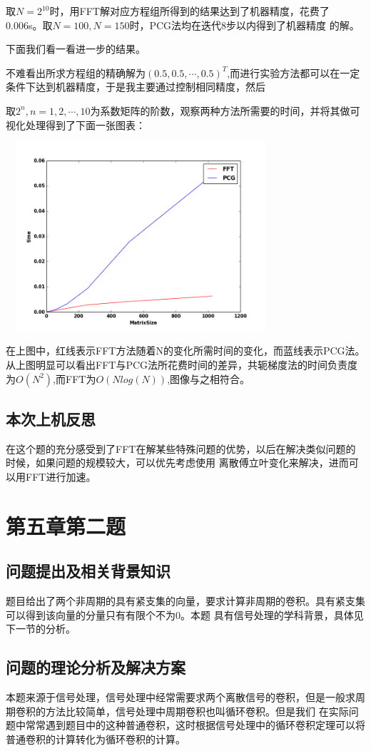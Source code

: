 \documentclass[10pt,a4paper]{ctexart}
\begin{document}
取$N=2^{10}$时，用FFT解对应方程组所得到的结果达到了机器精度，花费了0.006s。取$N=100,N=150$时，PCG法均在迭代8步以内得到了机器精度
的解。

下面我们看一看进一步的结果。

不难看出所求方程组的精确解为$(0.5,0.5,\cdots,0.5)^T$,而进行实验方法都可以在一定条件下达到机器精度，于是我主要通过控制相同精度，然后

取$2^{n},n=1,2,\cdots,10$为系数矩阵的阶数，观察两种方法所需要的时间，并将其做可视化处理得到了下面一张图表：
\par
\centerline{\includegraphics[height=7cm,width=10cm]{fft1.png}}
\par
在上图中，红线表示FFT方法随着N的变化所需时间的变化，而蓝线表示PCG法。
从上图明显可以看出FFT与PCG法所花费时间的差异，共轭梯度法的时间负责度为$O(N^2)$,而FFT为$O(Nlog(N))$,图像与之相符合。
\subsection{本次上机反思}
在这个题的充分感受到了FFT在解某些特殊问题的优势，以后在解决类似问题的时候，如果问题的规模较大，可以优先考虑使用
离散傅立叶变化来解决，进而可以用FFT进行加速。
\section{第五章第二题}
\subsection{问题提出及相关背景知识}
题目给出了两个非周期的具有紧支集的向量，要求计算非周期的卷积。具有紧支集可以得到该向量的分量只有有限个不为0。本题
具有信号处理的学科背景，具体见下一节的分析。
\subsection{问题的理论分析及解决方案}
本题来源于信号处理，信号处理中经常需要求两个离散信号的卷积，但是一般求周期卷积的方法比较简单，信号处理中周期卷积也叫循环卷积。但是我们
在实际问题中常常遇到题目中的这种普通卷积，这时根据信号处理中的循环卷积定理可以将普通卷积的计算转化为循环卷积的计算。
\end{document}
